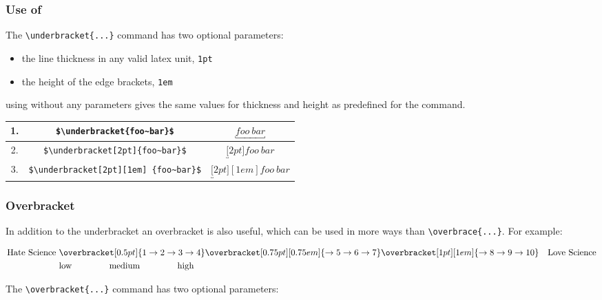 \begin{table}[htb]
\begin{enumerate}
\end{enumerate}

\subsubsection{Use of }

The \verb/\underbracket{...}/ command has two optional parameters:

\begin{itemize}
\item the line thickness in any valid latex unit, \eg \verb/1pt/
\item the height of the edge brackets, \eg \verb/1em/
\end{itemize}
using without any parameters gives the same values for thickness and
height as predefined for the  command.


\vspace{0.3cm}
\begin{center}
\begin{tabular}{|c|c|c|}
\hline
1.& \verb/$\underbracket{foo~bar}$/ & $\underbracket{foo~bar}$ \tabularnewline\hline
2.& \verb/$\underbracket[2pt]{foo~bar}$/ & $\underbracket[2pt]{foo~bar}$ \tabularnewline\hline
3.& \verb/$\underbracket[2pt][1em] {foo~bar}$/& $\underbracket[2pt][1em] {foo~bar}$\tabularnewline\hline
\end{tabular}
\end{center}


\subsubsection{Overbracket}

In addition to the underbracket an overbracket is also useful, which can be used in
more ways than \verb/\overbrace{...}/. For example:


\begin{eqnarray*}
\textrm{Hate Science  }& \overbracket[0.5pt]{1\rightarrow2\rightarrow3\rightarrow4}
    \overbracket[0.75pt][0.75em]{\rightarrow5\rightarrow6\rightarrow7}
    \overbracket[1pt][1em]{\rightarrow8\rightarrow9\rightarrow10} & \textrm{Love Science}\\
 & \textrm{low}\hspace{1.5cm}\textrm{medium}\hspace{1.5cm}\textrm{high}\nonumber
 \end{eqnarray*}


The \verb/\overbracket{...}/ command has two optional parameters:


\end{table}
